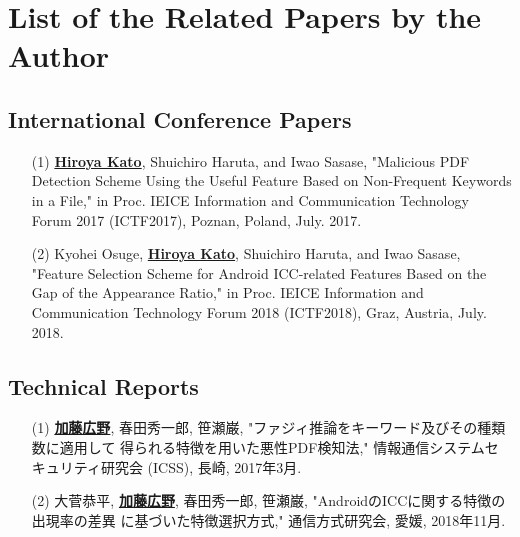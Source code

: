 \newpage
\appendix
\chapter{List of the Related Papers by the Author}

\section{International Conference Papers}
\begin{itemize}
  \item[(1)]
    {\bf \underline{Hiroya Kato}}, Shuichiro Haruta, and Iwao Sasase,
    "Malicious PDF Detection Scheme Using the Useful Feature Based on Non-Frequent Keywords in a File,"
    in Proc. IEICE Information and Communication Technology Forum 2017 (ICTF2017), Poznan, Poland, July. 2017.
  \item[(2)]
    Kyohei Osuge, {\bf \underline{Hiroya Kato}}, Shuichiro Haruta, and Iwao Sasase,
    "Feature Selection Scheme for Android ICC-related Features Based on the Gap of the Appearance Ratio,"
    in Proc. IEICE Information and Communication Technology Forum 2018 (ICTF2018), Graz, Austria, July. 2018.
\end{itemize}

\newpage

\section{Technical Reports}
\begin{itemize}
  \item[(1)]
    {\bf \underline{加藤広野}}, 春田秀一郎, 笹瀬巌,
    "ファジィ推論をキーワード及びその種類数に適用して 得られる特徴を用いた悪性PDF検知法,"
    情報通信システムセキュリティ研究会 (ICSS), 長崎, 2017年3月.
  \item[(2)]
    大菅恭平, {\bf \underline{加藤広野}}, 春田秀一郎, 笹瀬巌,
    "AndroidのICCに関する特徴の出現率の差異 に基づいた特徴選択方式,"
    通信方式研究会, 愛媛, 2018年11月.
\end{itemize}


